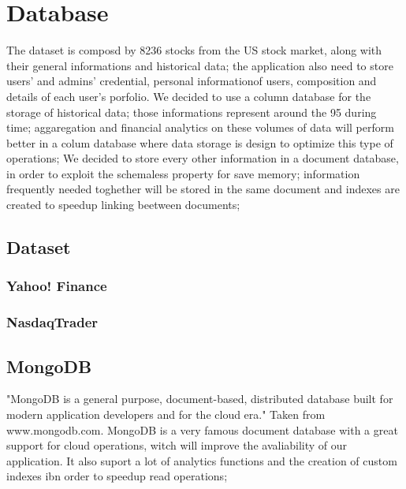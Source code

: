 \chapter{Database}

The dataset is composd by 8236 stocks from the US stock market, along with
their general informations and historical data; the application also need to store 
users' and admins' credential, personal informationof users, composition and details of
each user's porfolio.
We decided to use a column database for the storage of historical data; those 
informations represent around the 95%
during time; aggaregation and financial analytics on these volumes of data will perform
better in a colum database where data storage is design to optimize this type of operations;
We decided to store every other information in a document database, in order to exploit the
schemaless property for save memory; information frequently needed toghether will be stored 
in the same document and indexes are created to speedup linking beetween documents; 


\section{Dataset}

\subsection{Yahoo! Finance}

\subsection{NasdaqTrader}

\section{MongoDB}
"MongoDB is a general purpose, document-based, distributed database built 
for modern application developers and for the cloud era." Taken from www.mongodb.com.
MongoDB is a very famous document database with a great support for cloud operations, witch 
will improve the avaliability of our application. It also suport a lot of analytics functions
and the creation of custom indexes ibn order to speedup read operations;

